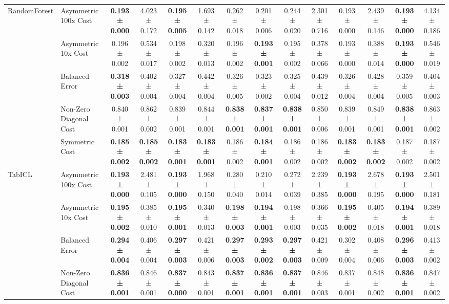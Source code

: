 \begin{table}[H]
{\begin{tabular}{llcccccccccccc}
\cline{1-14}
\multirow[t]{5}{*}{RandomForest} & Asymmetric 100x Cost & \textbf{0.193 ± 0.000} & 4.023 ± 0.172 & \textbf{0.195 ± 0.005} & 1.693 ± 0.142 & 0.262 ± 0.018 & 0.201 ± 0.006 & 0.244 ± 0.020 & 2.301 ± 0.716 & 0.193 ± 0.000 & 2.439 ± 0.146 & \textbf{0.193 ± 0.000} & 4.134 ± 0.186 \\
 & Asymmetric 10x Cost & 0.196 ± 0.002 & 0.534 ± 0.017 & 0.198 ± 0.002 & 0.320 ± 0.013 & 0.196 ± 0.002 & \textbf{0.193 ± 0.001} & 0.195 ± 0.002 & 0.378 ± 0.066 & 0.193 ± 0.000 & 0.388 ± 0.014 & \textbf{0.193 ± 0.000} & 0.546 ± 0.019 \\
 & Balanced Error & \textbf{0.318 ± 0.003} & 0.402 ± 0.004 & 0.327 ± 0.004 & 0.442 ± 0.004 & 0.326 ± 0.005 & 0.323 ± 0.002 & 0.325 ± 0.004 & 0.439 ± 0.012 & 0.326 ± 0.004 & 0.428 ± 0.004 & 0.359 ± 0.005 & 0.404 ± 0.003 \\
 & Non-Zero Diagonal Cost & 0.840 ± 0.001 & 0.862 ± 0.002 & 0.839 ± 0.001 & 0.844 ± 0.001 & \textbf{0.838 ± 0.001} & \textbf{0.837 ± 0.001} & \textbf{0.838 ± 0.001} & 0.850 ± 0.006 & 0.839 ± 0.001 & 0.849 ± 0.001 & \textbf{0.838 ± 0.001} & 0.863 ± 0.002 \\
 & Symmetric Cost & \textbf{0.185 ± 0.002} & \textbf{0.185 ± 0.002} & \textbf{0.183 ± 0.001} & \textbf{0.183 ± 0.001} & 0.186 ± 0.002 & \textbf{0.184 ± 0.001} & 0.186 ± 0.002 & 0.186 ± 0.002 & \textbf{0.183 ± 0.002} & \textbf{0.183 ± 0.002} & 0.187 ± 0.002 & 0.187 ± 0.002 \\
\cline{1-14}
\multirow[t]{5}{*}{TabICL} & Asymmetric 100x Cost & \textbf{0.193 ± 0.000} & 2.481 ± 0.105 & \textbf{0.193 ± 0.000} & 1.968 ± 0.150 & 0.280 ± 0.040 & 0.210 ± 0.014 & 0.272 ± 0.039 & 2.239 ± 0.385 & \textbf{0.193 ± 0.000} & 2.678 ± 0.195 & \textbf{0.193 ± 0.000} & 2.501 ± 0.181 \\
 & Asymmetric 10x Cost & \textbf{0.195 ± 0.002} & 0.385 ± 0.010 & \textbf{0.195 ± 0.001} & 0.340 ± 0.013 & \textbf{0.198 ± 0.003} & \textbf{0.194 ± 0.001} & 0.198 ± 0.003 & 0.366 ± 0.035 & \textbf{0.195 ± 0.002} & 0.405 ± 0.018 & \textbf{0.194 ± 0.001} & 0.389 ± 0.018 \\
 & Balanced Error & \textbf{0.294 ± 0.004} & 0.406 ± 0.004 & \textbf{0.297 ± 0.003} & 0.421 ± 0.006 & \textbf{0.297 ± 0.003} & \textbf{0.293 ± 0.002} & \textbf{0.297 ± 0.003} & 0.421 ± 0.009 & 0.302 ± 0.004 & 0.408 ± 0.006 & \textbf{0.296 ± 0.003} & 0.413 ± 0.002 \\
 & Non-Zero Diagonal Cost & \textbf{0.836 ± 0.001} & 0.846 ± 0.001 & \textbf{0.837 ± 0.000} & 0.843 ± 0.001 & \textbf{0.837 ± 0.001} & \textbf{0.836 ± 0.001} & \textbf{0.837 ± 0.001} & 0.846 ± 0.003 & 0.837 ± 0.001 & 0.848 ± 0.002 & \textbf{0.836 ± 0.001} & 0.847 ± 0.002 \\

\end{tabular}}
\end{table}
